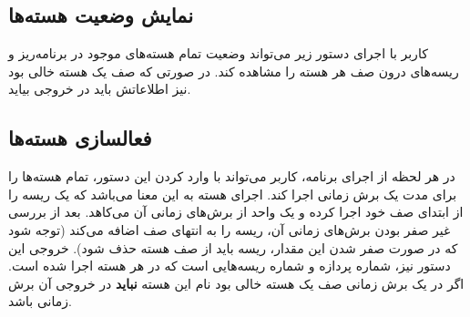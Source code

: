 \documentclass{utap}
\begin{document}
	\linespread{1.6}
	\begin{latin}%
		\centering
		\begin{minipage}[t]{1\textwidth}
			{}
			{}
			{}
		\end{minipage}%
	\end{latin}

	\subsection{نمایش وضعیت هسته‌ها}
	\hspace{5mm}
	کاربر با اجرای دستور زیر می‌تواند وضعیت تمام هسته‌های موجود در برنامه‌ریز و ریسه‌های درون صف هر هسته را مشاهده کند. در صورتی که صف یک هسته‌ خالی بود نیز اطلاعاتش باید در خروجی بیاید.
	
	\linespread{1.6}
	\begin{latin}%
		\centering
		\begin{minipage}[t]{1\textwidth}
			{}
			{}
			{}
		\end{minipage}%
	\end{latin}

	\subsection{فعالسازی هسته‌ها}
	\hspace{5mm}
	در هر لحظه از اجرای برنامه، کاربر می‌تواند با وارد کردن این دستور، تمام هسته‌ها را برای مدت یک برش زمانی اجرا کند. اجرای هسته به این معنا می‌باشد که یک ریسه‌ را از ابتدای صف خود  اجرا کرده و یک واحد از برش‌های زمانی آن می‌کاهد. بعد از بررسی غیر صفر بودن برش‌های زمانی آن، ریسه را به انتهای صف اضافه می‌کند (توجه شود که در صورت صفر شدن این مقدار،‌ ریسه باید از صف هسته حذف شود).
	خروجی این دستور نیز، شماره پردازه و شماره ریسه‌هایی است که در هر هسته اجرا شده است. اگر در یک برش زمانی صف یک هسته خالی بود نام این هسته\textbf{ نباید} در خروجی آن برش زمانی باشد.
	
	\linespread{1.6}
	\begin{latin}%
		\centering
		\begin{minipage}[t]{1\textwidth}
			{}
			{}
			{}
		\end{minipage}%
	\end{latin}
\end{document}
